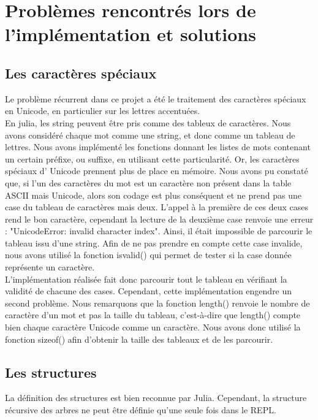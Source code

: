 \documentclass[a4paper,12pt]{article}
\begin{document}
\section{Problèmes rencontrés lors de l'implémentation et solutions}
\subsection{Les caractères spéciaux}
Le problème récurrent dans ce projet a été le traitement des caractères spéciaux en Unicode, en particulier sur les lettres accentuées.\\
En julia, les string peuvent être pris comme des tableux de caractères. Nous avons considéré chaque mot comme une string, et donc comme un tableau de lettres. Nous avons implémenté les fonctions donnant les listes de mots contenant un certain préfixe, ou suffixe, en utilisant cette particularité. Or, les caractères spéciaux d' Unicode prennent plus de place en mémoire. Nous avons pu constaté que, si l'un des caractères du mot est un caractère non présent dans la table ASCII mais Unicode, alors son codage est plus conséquent et ne prend pas une case du tableau de caractères mais deux. L'appel à la première de ces deux cases rend le bon caractère, cependant la lecture de la deuxième case renvoie une erreur : "UnicodeError: invalid character index". Ainsi, il était impossible de parcourir le tableau issu d'une string. Afin de ne pas prendre en compte cette case invalide, nous avons utilisé la fonction isvalid() qui permet de tester si la case donnée représente un caractère. \\
L'implémentation réalisée fait donc parcourir tout le tableau en vérifiant la validité de chacune des cases. Cependant, cette implémentation engendre un second problème. Nous remarquons que la fonction length() renvoie le nombre de caractère d'un mot et pas la taille du tableau, c'est-à-dire que length() compte bien chaque caractère Unicode comme un caractère. Nous avons donc utilisé la fonction sizeof() afin d'obtenir la taille des tableaux et de les parcourir.\\

\subsection{Les structures}
La définition des structures est bien reconnue par Julia. Cependant, la structure récursive des arbres ne peut être définie qu'une seule fois dans le REPL.
\end{document}
